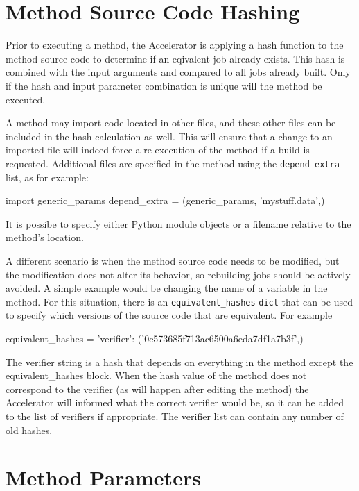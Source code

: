 \section{Method Source Code Hashing}

Prior to executing a method, the Accelerator is applying a hash
function to the method source code to determine if an eqivalent job
already exists.  This hash is combined with the input arguments and
compared to all jobs already built.  Only if the hash and input
parameter combination is unique will the method be executed.

A method may import code located in other files, and these other files
can be included in the hash calculation as well.  This will ensure
that a change to an imported file will indeed force a re-execution of
the method if a build is requested.  Additional files are specified in
the method using the \texttt{depend\_extra} list, as for example:
\begin{python}
import generic_params
depend_extra = (generic_params, 'mystuff.data',)
\end{python}
It is possibe to specify either Python module objects or a filename
relative to the method's location.

A different scenario is when the method source code needs to be
modified, but the modification does not alter its behavior, so
rebuilding jobs should be actively avoided.  A simple example would be
changing the name of a variable in the method.  For this situation,
there is an \texttt{equivalent\_hashes} \texttt{dict} that can be used
to specify which versions of the source code that are equivalent.  For
example
\begin{python}
equivalent_hashes = {'verifier': ('0c573685f713ac6500a6eda7df1a7b3f',)}
\end{python}
The verifier string is a hash that depends on everything in the method
except the equivalent\_hashes block.  When the hash value of the
method does not correspond to the verifier (as will happen after
editing the method) the Accelerator will informed what the correct
verifier would be, so it can be added to the list of verifiers if
appropriate.  The verifier list can contain any number of old hashes.




\clearpage
\section{Method Parameters}

